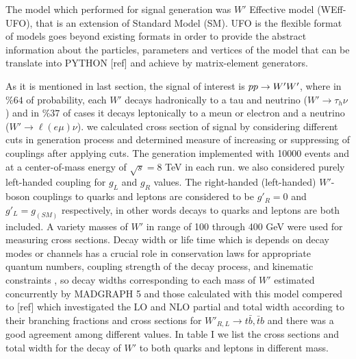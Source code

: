 The model which performed for signal generation was $W'$ Effective model {\small (WEff-UFO)}, that is an extension of Standard Model {\small (SM)}. {\small UFO} is the flexible format of models goes beyond existing formats in order to provide the abstract information about the particles, parameters and vertices of the model that can be translate into {\small PYTHON} [ref] and achieve by matrix-element generators. 

As it is mentioned in last section, the signal of interest is $ pp\rightarrow {\tiny W' W'} $, where in $\%64$ of probability, each $ W'$ decays hadronically to a tau and neutrino ($ W' \rightarrow \tau_{h} \nu $) and in $\%37$ of cases it decays leptonically to a meun or electron and a neutrino ($ W' \rightarrow \ell(e\mu) \nu  $). we calculated cross section of signal by considering different cuts in generation process and determined measure of increasing or suppressing of couplings after applying cuts. The generation implemented with 10000 events and at a center-of-mass energy of $ \sqrt{s}=8 $ TeV in each run. we also considered purely left-handed coupling  for $ g_L $ and $ g_R $ values.  The right-handed (left-handed) $W'$-boson couplings to quarks and leptons are considered to be $g'_R = 0$ and $g'_L = g_{(SM)}$ respectively, in other words decays to quarks and leptons are both included. A variety masses of $W'$ in range of 100 through 400 GeV were used for measuring cross sections.  Decay width or life time which is depends on decay modes or channels has a crucial role in conservation laws for appropriate quantum numbers, coupling strength of the decay process, and kinematic constraints , so decay widths corresponding to each mass of $ W' $ estimated concurrently by {\small MADGRAPH 5} and those calculated with this model compered to [ref] which investigated the LO and NLO partial and total width according to their branching fractions and cross sections for  $ W'_{R,L}\rightarrow t \bar{b},\bar{t}b $  and there was a good agreement among different values.  In table I we list the cross sections and total width for the decay of $ W' $ to both quarks and leptons in different mass. 

